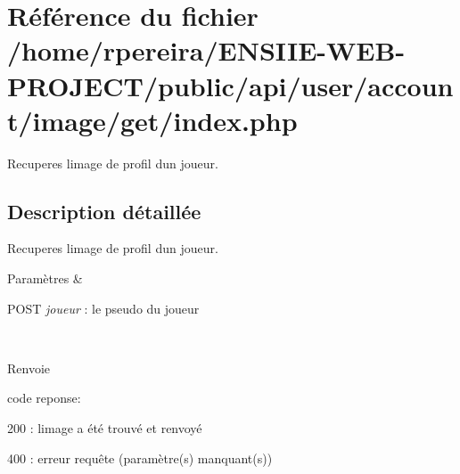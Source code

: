 \hypertarget{account_2image_2get_2index_8php}{}\section{Référence du fichier /home/rpereira/\+E\+N\+S\+I\+I\+E-\/\+W\+E\+B-\/\+P\+R\+O\+J\+E\+C\+T/public/api/user/account/image/get/index.php}
\label{account_2image_2get_2index_8php}


Recuperes l\textquotesingle{}image de profil d\textquotesingle{}un joueur.  




\subsection{Description détaillée}
Recuperes l\textquotesingle{}image de profil d\textquotesingle{}un joueur. 


\begin{DoxyParams}{Paramètres}
{\em } & 
\begin{DoxyItemize}
\item P\+O\+ST {\itshape joueur} \+: le pseudo du joueur 
\end{DoxyItemize}\\
\hline
\end{DoxyParams}
\begin{DoxyReturn}{Renvoie}

\begin{DoxyItemize}
\item code reponse\+:
\begin{DoxyItemize}
\item 200 \+: l\textquotesingle{}image a été trouvé et renvoyé
\item 400 \+: erreur requête (paramètre(s) manquant(s)) 
\end{DoxyItemize}
\end{DoxyItemize}
\end{DoxyReturn}

